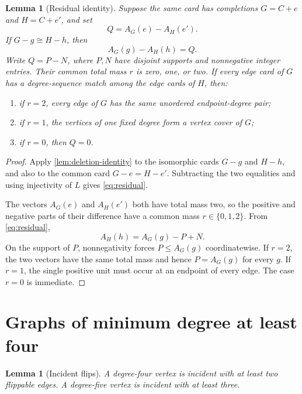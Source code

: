 \documentclass[11pt]{article}
\newtheorem{lemma}[theorem]{Lemma}
\theoremstyle{definition}
\theoremstyle{remark}
\begin{document}
\begin{lemma}[Residual identity]\label{lem:residual}
Suppose the same card has completions \(G=C+e\) and \(H=C+e'\), and set
\[
                  Q=A_G(e)-A_H(e').
\]
If \(G-g\cong H-h\), then
\[
                  A_G(g)-A_H(h)=Q.                 \tag{C.1}\label{eq:residual}
\]
Write \(Q=P-N\), where \(P,N\) have disjoint supports and nonnegative
integer entries.  Their common total mass \(r\) is zero, one, or two.  If
every edge card of \(G\) has a degree-sequence match among the edge cards of
\(H\), then:
\begin{enumerate}[label=\textup{(\roman*)},leftmargin=2.2em]
\item if \(r=2\), every edge of \(G\) has the same unordered endpoint-degree
pair;
\item if \(r=1\), the vertices of one fixed degree form a vertex cover of
\(G\);
\item if \(r=0\), then \(Q=0\).
\end{enumerate}
\end{lemma}

\begin{proof}
Apply \cref{lem:deletion-identity} to the isomorphic cards \(G-g\) and
\(H-h\), and also to the common card \(G-e=H-e'\).  Subtracting the two
equalities and using injectivity of \(L\) gives \eqref{eq:residual}.

The vectors \(A_G(e)\) and \(A_H(e')\) both have total mass two, so the
positive and negative parts of their difference have a common mass
\(r\in\{0,1,2\}\).  From \eqref{eq:residual},
\[
                  A_H(h)=A_G(g)-P+N.
\]
On the support of \(P\), nonnegativity forces \(P\le A_G(g)\)
coordinatewise.  If \(r=2\), the two vectors have the same total mass and
hence \(P=A_G(g)\) for every \(g\).  If \(r=1\), the single positive unit
must occur at an endpoint of every edge.  The case \(r=0\) is immediate.
\end{proof}

\section{Graphs of minimum degree at least four}\label{app:high-degree}

\begin{lemma}[Incident flips]\label{lem:incident-flips}
A degree-four vertex is incident with at least two flippable edges.  A
degree-five vertex is incident with at least three.
\end{lemma}
\end{document}
